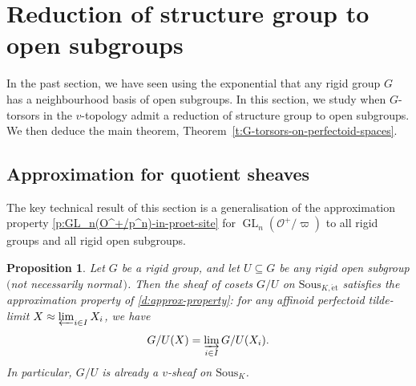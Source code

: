 \documentclass[10pt,a4paper]{article}
\newtheorem{Proposition}[thm]{Proposition}
\theoremstyle{definition}
\theoremstyle{remark}
\renewcommand{\O}{\mathcal{O}}
\newcommand{\GL}{\operatorname{GL}}
\newcommand{\et}{{\operatorname{\acute{e}t}}}
\numberwithin{equation}{section}
\begin{document}
\section{Reduction of structure group to open subgroups}\label{s:quot-sheaves}
In the past section, we have seen using the exponential that any rigid group $G$ has a neighbourhood basis of open subgroups. In this section, we study when $G$-torsors in the $v$-topology admit a reduction of structure group to open subgroups. We then deduce the main theorem, Theorem~\ref{t:G-torsors-on-perfectoid-spaces}.

\subsection{Approximation for quotient sheaves}\label{s:approx-quot-sheaves}
The key technical result of this section is a generalisation of the approximation property \cref{p:GL_n(O^+/p^n)-in-proet-site} for $\GL_n(\O^+/\varpi)$ to all rigid groups and all rigid open subgroups.  

\begin{Proposition}\label{p:approx-property-for-G/U}
	Let $G$ be a rigid group, and let $U\subseteq G$ be any rigid open subgroup $($not necessarily normal\,$)$. Then the sheaf of cosets $G/U$ on $\mathrm{Sous}_{K,\et}$ satisfies the approximation property of \cref{d:approx-property}: for any affinoid perfectoid tilde-limit $X\approx \varprojlim_{i\in I} X_i$, we have
	\[ G/U(X)=\varinjlim_{i\in I} G/U(X_i).\]
	In particular, $G/U$ is already a $v$-sheaf on $\mathrm{Sous}_{K}$. 
\end{Proposition}
\end{document}

